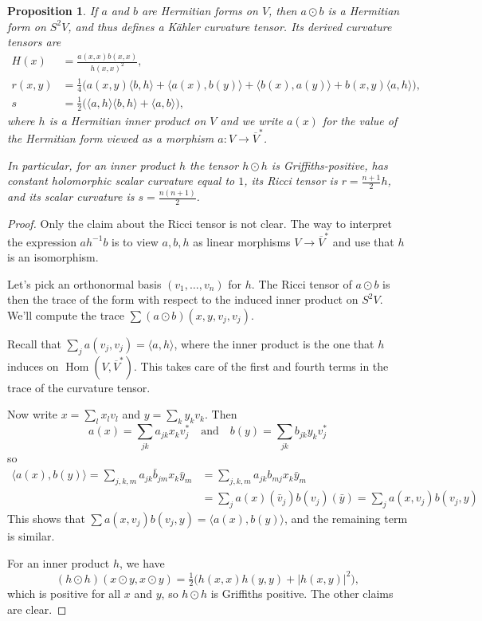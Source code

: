 \documentclass[10pt,a4paper]{article}
\newtheorem{prop}[theo]{Proposition}
\newtheorem*{proof}{Proof}
\def\qandq{\quad\text{and}\quad}
\DeclareMathOperator{\Hom}{Hom}
\begin{document}
\begin{prop}
  If $a$ and $b$ are Hermitian forms on $V$, then $a \odot b$ is a Hermitian form on $S^2V$, and thus defines a K\"ahler curvature tensor. Its derived curvature tensors are
\begin{align*}
H(x) &= \frac{a(x,x)b(x,x)}{h(x,x)^2},
\\
r(x,y) &= \tfrac 14 \bigl(
a(x,y) \langle b, h \rangle
+ \langle a(x), b(y) \rangle
+ \langle b(x), a(y) \rangle
+ b(x,y) \langle a, h \rangle
\bigr),
\\
s &= \tfrac 12 \bigl(
\langle a, h \rangle \langle b, h \rangle
+ \langle a, b \rangle
\bigr),
\end{align*}
where $h$ is a Hermitian inner product on $V$ and we write $a(x)$ for the value of the Hermitian form viewed as a morphism $a : V \to \overline V^*$.

In particular, for an inner product $h$ the tensor $h \odot h$ is Griffiths-positive, has constant holomorphic scalar curvature equal to $1$, its Ricci tensor is $r = \frac{n+1}{2} h$, and its scalar curvature is $s = \frac{n(n+1)}2$.
\end{prop}

\begin{proof}
  Only the claim about the Ricci tensor is not clear. The way to interpret the expression $ah^{-1}b$ is to view $a, b, h$ as linear morphisms $V \to \overline V^*$ and use that $h$ is an isomorphism.

Let's pick an orthonormal basis $(v_1, \ldots, v_n)$ for $h$. The Ricci tensor of $a \odot b$ is then the trace of the form with respect to the induced inner product on $S^2V$. We'll compute the trace $\sum (a\odot b) (x,y,v_j,v_j)$.

Recall that $\sum_j a(v_j,v_j) = \langle a, h \rangle$, where the inner product is the one that $h$ induces on $\Hom(V, \overline V^*)$. This takes care of the first and fourth terms in the trace of the curvature tensor.

Now write $x = \sum_{l} x_l v_l$ and $y = \sum_{k} y_k v_k$. Then
\[
a(x) = \sum_{jk} a_{jk}x_k v_j^*
\qandq
b(y) = \sum_{jk} b_{jk} y_k v_j^*
\]
so
\begin{align*}
\langle a(x), b(y) \rangle
= \sum_{j,k,m} a_{jk} \bar b_{jm} x_k \bar y_m
&= \sum_{j,k,m} a_{jk} b_{mj} x_k \bar y_m
\\
&= \sum_{j}a(x)(\bar v_j) b(v_j)(\bar y)
= \sum_j a(x,v_j) b(v_j, y)
\end{align*}
This shows that $\sum a(x,v_j)b(v_j,y) = \langle a(x), b(y) \rangle$, and the remaining term is similar.

For an inner product $h$, we have
$$
(h \odot h)(x \odot y, x \odot y)
= \tfrac12 \bigl(
h(x,x)h(y,y) + |h(x,y)|^2
\bigr),
$$
which is positive for all $x$ and $y$, so $h \odot h$ is Griffiths positive. The other claims are clear.
\end{proof}
\end{document}
